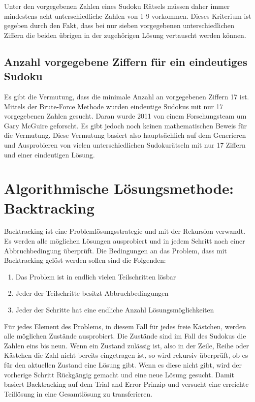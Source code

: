 Unter den vorgegebenen Zahlen eines Sudoku Rätsels müssen daher immer mindestens acht unterschiedliche Zahlen von 1-9 vorkommen. Dieses Kriterium ist gegeben durch den Fakt, dass bei nur sieben vorgegebenen unterschiedlichen Ziffern die beiden übrigen in der zugehörigen Lösung vertauscht werden können. \cite{HerzbergMurty}

\subsection{Anzahl vorgegebene Ziffern für ein eindeutiges Sudoku}  
Es gibt die Vermutung, dass die minimale Anzahl an vorgegebenen Ziffern 17 ist. Mittels der Brute-Force Methode wurden eindeutige Sudokus mit nur 17 vorgegebenen Zahlen gesucht. Daran wurde 2011 von einem Forschungsteam um Gary McGuire geforscht. Es gibt jedoch noch keinen mathematischen Beweis für die Vermutung. Diese Vermutung basiert also hauptsächlich auf dem Generieren und Ausprobieren von vielen unterschiedlichen Sudokurätseln mit nur 17 Ziffern und einer eindeutigen Lösung. \cite{FAZ}

\section{Algorithmische Lösungsmethode: Backtracking}
Backtracking ist eine Problemlösungsstrategie und mit der Rekursion verwandt. Es werden alle möglichen Lösungen ausprobiert und in jedem Schritt nach einer Abbruchbedingung überprüft. Die Bedingungen an das Problem, dass mit Backtracking gelöst werden sollen sind die Folgenden: 
\begin{enumerate}
	\item Das Problem ist in endlich vielen Teilschritten lösbar
	\item Jeder der Teilschritte besitzt Abbruchbedingungen
	\item Jeder der Schritte hat eine endliche Anzahl Lösungsmöglichkeiten
\end{enumerate}

Für jedes Element des Problems, in diesem Fall für jedes freie Kästchen, werden alle möglichen Zustände ausprobiert. Die Zustände sind im Fall des Sudokus die Zahlen eins bis neun. Wenn ein Zustand zulässig ist, also in der Zeile, Reihe oder Kästchen die Zahl nicht bereits eingetragen ist, so wird rekursiv überprüft, ob es für den aktuellen Zustand eine Lösung gibt. Wenn es diese nicht gibt, wird der vorherige Schritt Rückgängig gemacht und eine neue Lösung gesucht. 
Damit basiert Backtracking auf dem Trial and Error Prinzip und versucht eine erreichte Teillösung in eine Gesamtlösung zu transferieren. 

